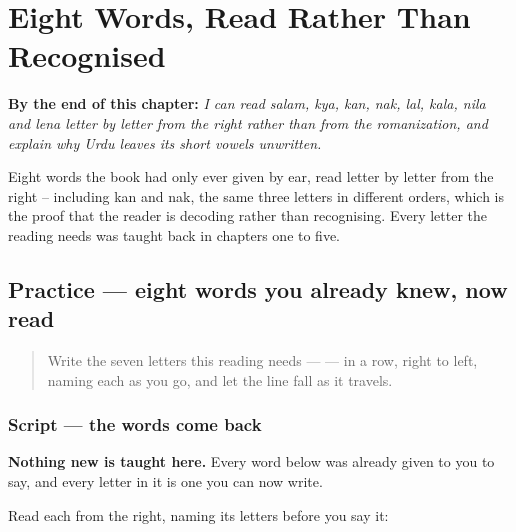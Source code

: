 
\chapter{Eight Words, Read Rather Than Recognised}
\label{ch:ur-script-seven}

\begin{chapteropening}
\textbf{By the end of this chapter:} \emph{I can read salam, kya, kan, nak, lal, kala, nila and lena letter by letter from the right rather than from the romanization, and explain why Urdu leaves its short vowels unwritten.}

Eight words the book had only ever given by ear, read letter by letter from the right -- including kan and nak, the same three letters in different orders, which is the proof that the reader is decoding rather than recognising. Every letter the reading needs was taught back in chapters one to five.
\end{chapteropening}

\section[Practice]{Practice — eight words you already knew, now read}

\label{lesson:UR-C16-practice}



\begin{quote}
Write the seven letters this reading needs —        — in a row, right to left, naming each as you go, and let the line fall as it travels.
\end{quote}

\subsection*{Script — the words come back}
\textbf{Nothing new is taught here.} Every word below was already given to you to say, and every letter in it is one you can now write.

Read each from the right, naming its letters before you say it:

\begin{quote}
\end{quote}

\begin{quote}
\end{quote}

